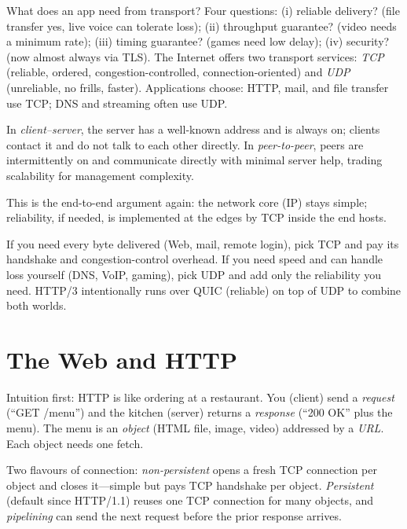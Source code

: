 What does an app need from transport? Four questions: (i) reliable delivery? (file transfer yes, live voice can tolerate loss); (ii) throughput guarantee? (video needs a minimum rate); (iii) timing guarantee? (games need low delay); (iv) security? (now almost always via TLS). The Internet offers two transport services: \emph{TCP} (reliable, ordered, congestion-controlled, connection-oriented) and \emph{UDP} (unreliable, no frills, faster). Applications choose: HTTP, mail, and file transfer use TCP; DNS and streaming often use UDP.

\begin{definition}
In \emph{client--server}, the server has a well-known address and is always on; clients contact it and do not talk to each other directly. In \emph{peer-to-peer}, peers are intermittently on and communicate directly with minimal server help, trading scalability for management complexity.
\end{definition}

This is the end-to-end argument again: the network core (IP) stays simple; reliability, if needed, is implemented at the edges by TCP inside the end hosts.

\begin{remark}
If you need every byte delivered (Web, mail, remote login), pick TCP and pay its handshake and congestion-control overhead. If you need speed and can handle loss yourself (DNS, VoIP, gaming), pick UDP and add only the reliability you need. HTTP/3 intentionally runs over QUIC (reliable) on top of UDP to combine both worlds.
\end{remark}

\section{The Web and HTTP}
\label{sec:http}
Intuition first: HTTP is like ordering at a restaurant. You (client) send a \emph{request} (``GET /menu'') and the kitchen (server) returns a \emph{response} (``200 OK'' plus the menu). The menu is an \emph{object} (HTML file, image, video) addressed by a \emph{URL}. Each object needs one fetch.

Two flavours of connection: \emph{non-persistent} opens a fresh TCP connection per object and closes it---simple but pays TCP handshake per object. \emph{Persistent} (default since HTTP/1.1) reuses one TCP connection for many objects, and \emph{pipelining} can send the next request before the prior response arrives.

